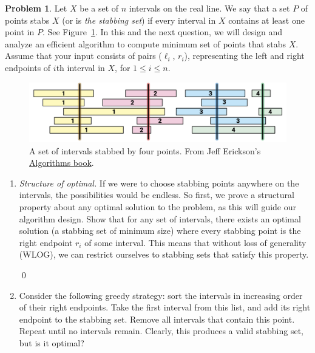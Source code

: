 \documentclass[11pt]{article}
\theoremstyle{definition}
\newtheorem{question}{Problem}
\newenvironment{solution}{\bigskip\noindent{\it Solution.}  \ignorespaces}{\hfill\qed}
\begin{document}
\begin{question} 
Let $X$ be a set of $n$ intervals on the real line. We say that a set $P$ of points
stabs $X$ (or is \emph{the stabbing set}) if every interval in $X$ contains at least one point in $P$. See Figure~\ref{fig:stabbing}. In this and the next question, we will design and analyze an efficient algorithm to compute minimum set of points that
stabs $X$. Assume that your input consists of pairs ($\ell_i$, $r_i$), representing the left and right endpoints of $i$th interval in $X$, for $1\leq i \leq n$. 

\begin{figure}[h]\label{fig:stabbing}
\centering
\includegraphics[scale=0.15]{stabbing.png}\caption{A set of intervals stabbed by four points. From Jeff Erickson's \href{www.algorithms.wtf}{Algorithms book}.}
\end{figure}
\vspace{-10pt}



\begin{enumerate}[noitemsep, label = (\alph*), leftmargin=*]
 
    \item\label{parta} \emph{Structure of optimal.} If we were to choose stabbing points anywhere on the intervals, the possibilities would be endless.  So first, we prove a structural property about any optimal solution to the problem, as this will guide our algorithm design.  Show that for any set of intervals, there exists an optimal solution (a stabbing set of minimum size) where every stabbing point is the right endpoint $r_i$ of some interval. This means that without loss of generality (WLOG), we can restrict ourselves to stabbing sets that satisfy this property. 


\begin{solution}
\end{solution}


   
\item  Consider the following greedy strategy: sort the intervals in increasing order of their right endpoints. Take the first interval from this list, and add its right endpoint to the stabbing set. Remove all intervals that contain this point. Repeat until no intervals remain. Clearly, this produces a valid stabbing set, but is it optimal? 


\end{enumerate}
\end{question}
\end{document}
